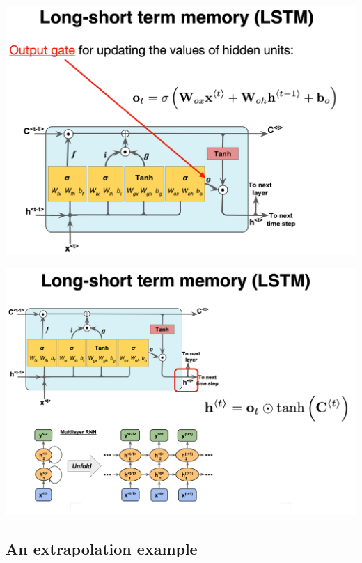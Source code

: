 \documentclass[%
oneside,                 %
final,                   %
10pt]{article}
\begin{document}
\vspace{6mm}

\vspace{6mm}

\centerline{\includegraphics[width=0.9\linewidth]{figslides/RNN21.png}}

\vspace{6mm}

\vspace{6mm}

\centerline{\includegraphics[width=0.9\linewidth]{figslides/RNN22.png}}

\vspace{6mm}

\subsection*{An extrapolation example}
\end{document}
